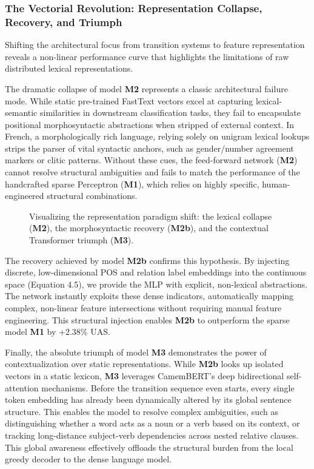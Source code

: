 \documentclass[12pt,a4paper]{article}
\begin{document}
\subsubsection{The Vectorial Revolution: Representation Collapse, Recovery, and Triumph}
Shifting the architectural focus from transition systems to feature representation reveals a non-linear performance curve that highlights the limitations of raw distributed lexical representations.

The dramatic collapse of model \textbf{M2} represents a classic architectural failure mode. While static pre-trained FastText vectors excel at capturing lexical-semantic similarities in downstream classification tasks, they fail to encapsulate positional morphosyntactic abstractions when stripped of external context. In French, a morphologically rich language, relying solely on unigram lexical lookups strips the parser of vital syntactic anchors, such as gender/number agreement markers or clitic patterns. Without these cues, the feed-forward network (\textbf{M2}) cannot resolve structural ambiguities and fails to match the performance of the handcrafted sparse Perceptron (\textbf{M1}), which relies on highly specific, human-engineered structural combinations.

\begin{figure}[htbp]
\centering
\caption{Visualizing the representation paradigm shift: the lexical collapse (\textbf{M2}), the morphosyntactic recovery (\textbf{M2b}), and the contextual Transformer triumph (\textbf{M3}).}
\label{fig:representation_trajectory}
\end{figure}

The recovery achieved by model \textbf{M2b} confirms this hypothesis. By injecting discrete, low-dimensional POS and relation label embeddings into the continuous space (Equation 4.5), we provide the MLP with explicit, non-lexical abstractions. The network instantly exploits these dense indicators, automatically mapping complex, non-linear feature intersections without requiring manual feature engineering. This structural injection enables \textbf{M2b} to outperform the sparse model \textbf{M1} by +2.38\% UAS.

Finally, the absolute triumph of model \textbf{M3} demonstrates the power of contextualization over static representations. While \textbf{M2b} looks up isolated vectors in a static lexicon, \textbf{M3} leverages CamemBERT's deep bidirectional self-attention mechanisms. Before the transition sequence even starts, every single token embedding has already been dynamically altered by its global sentence structure. This enables the model to resolve complex ambiguities, such as distinguishing whether a word acts as a noun or a verb based on its context, or tracking long-distance subject-verb dependencies across nested relative clauses. This global awareness effectively offloads the structural burden from the local greedy decoder to the dense language model.
\end{document}
